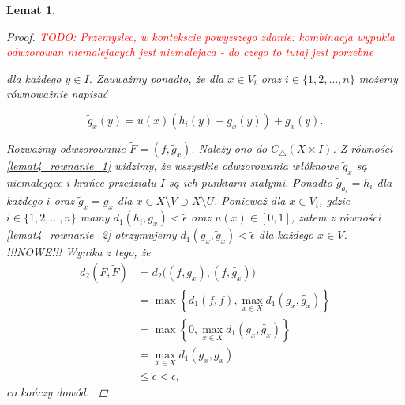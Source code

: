 \documentclass[licencjacka]{pwr_wmat_praca_dyplomowa}
\theoremstyle{plain}
\numberwithin{theorem}{chapter}
\newtheorem{lemma}[theorem]{Lemat}
\theoremstyle{definition}
\numberwithin{theorem}{chapter}
\begin{document}
\begin{lemma}
\begin{proof}
\textcolor{red}{TODO: Przemyslec, w kontekscie powyzszego zdanie: kombinacja wypukla odwzorowan niemalejacych jest niemalejaca - do czego to tutaj jest porzebne}

dla każdego $y \in I$. Zauważmy ponadto, że dla $x \in V_i$ oraz $i \in \{1,2,\ldots,n\}$ możemy równoważnie napisać

\begin{equation} \label{lemat4_rownanie_2}
\widetilde{g}_x(y) = u(x)(h_i(y) - g_x(y)) + g_x(y).
\end{equation}

Rozważmy odwzorowanie $\widetilde{F} = (f, \widetilde{g}_x)$. Należy ono do $C_\triangle(X \times I)$. Z równości \ref{lemat4_rownanie_1} widzimy, że wszystkie odwzorowania włóknowe $\widetilde{g}_x$ są niemalejące i krańce przedziału $I$ są ich punktami stałymi. Ponadto $\widetilde{g}_{a_i} = h_i$ dla każdego $i$ oraz $\widetilde{g}_x = g_x$ dla $x \in X \setminus V \supset X \setminus U$. Ponieważ dla $x \in V_i$, gdzie $i \in \{1,2,\ldots,n\}$ mamy $d_1(h_i, g_x) < \widetilde{\epsilon}$ oraz $u(x) \in [0,1]$, zatem z równości \ref{lemat4_rownanie_2} otrzymujemy $d_1(g_x, \widetilde{g}_x) < \widetilde{\epsilon}$ dla każdego $x \in V$. {\color{red} !!!NOWE!!!
Wynika z tego, że 
\begin{align*}
d_2(F, \widetilde{F}) & = d_2\big((f, g_x), (f, \widetilde{g_x})\big) \\
& = \max\left\{d_1(f, f), \max_{x \in X}d_1(g_x, \widetilde{g_x})\right\} \\
& = \max\left\{0, \max_{x \in X}d_1(g_x, \widetilde{g_x})\right\} \\
& = \max_{x \in X}d_1(g_x, \widetilde{g_x}) \\
& \leq \widetilde{\epsilon} < \epsilon,
\end{align*}
co kończy dowód.
}
\end{proof}

\end{lemma}
\end{document}
